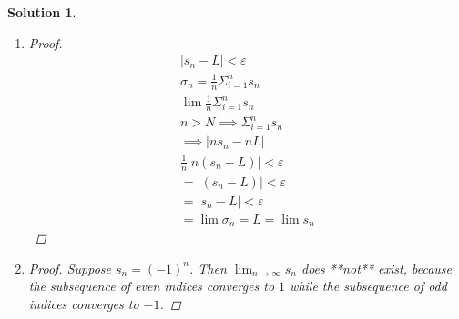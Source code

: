 \documentclass[12pt]{article}
\newtheorem{solution}{Solution}
\begin{document}
\begin{solution}
\begin{enumerate}
\begin{proof}
\begin{align}
                \leq \frac{s_{1} +\ldots +s_{L}  }{M}+\sup \left\{ s_{N} |N>L \right\} 
            \end{align}
            \begin{align}
                \sup \left\{ \sigma_{N} |N>M \right\} \leq \frac{s_{1} +\ldots +s_{L}  }{M}+\sup \left\{ s_{N} |N>L \right\} 
            \end{align}
            We know that the RHS above is independent of $N$, so we take the limit of both sides above. Doing so results in the following: 
            \begin{align}
                \limsup_{N \to \infty} \sup \sigma_{N} =\limsup_{M \to \infty} \sigma_{N} \left\{ N|N>M \right\}\\[10pt] 
                \leq \lim_{M \to \infty} (\underbrace{\frac{s_{1} +\ldots +s_{L}}{M}}_{\text{goes to $0$  as $M\to infinity$ } } +\sup \left\{ s_{N} |N>L \right\} )
            \end{align}
            \begin{align}
             \limsup_{N \to \infty} \sigma_{N} \leq \sup \left\{ s_{N} |N>L \right\} 
            \end{align}
       \end{proof}
        \item \begin{proof}
           \begin{align}
            \left\vert s_{n} -L \right\vert < \varepsilon \\[10pt] 
            \sigma_{n} = \frac{1}{n} \Sigma_{i=1}^{n}s_{n} \\[10pt] 
            \lim \frac{1}{n}\Sigma_{i=1}^{n}s_{n}\\[10pt]  
            n>N \implies \Sigma_{i=1}^{n}s_{n} \\[10pt] 
            \implies \left\vert ns_{n} -nL \right\vert \\[10pt] 
            \frac{1}{n}\left\vert n(s_{n} -L) \right\vert <\varepsilon \\[10pt] 
            =\left\vert (s_{n} -L) \right\vert <\varepsilon \\[10pt] 
            = \left\vert s_{n} -L \right\vert <\varepsilon \\[10pt] 
            = \lim \sigma_{n} = L=\lim s_{n}  
           \end{align}  
        \end{proof}
        \item
      \begin{proof}
        Suppose $s_n = (-1)^n$.  Then
        $\displaystyle\lim_{n\to\infty}s_n$ does **not** exist,
        because the subsequence of even indices converges to $1$ while
        the subsequence of odd indices converges to $-1$.


\end{proof}
\end{enumerate}
\end{solution}
\end{document}
